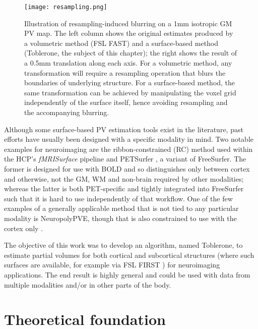 \begin{figure}
\centering
\texttt{[image: resampling.png]}
\caption{Illustration of resampling-induced blurring on a 1mm isotropic GM PV map. The left column shows the original estimates produced by a volumetric method (FSL FAST) and a surface-based method (Toblerone, the subject of this chapter); the right shows the result of a 0.5mm translation along each axis. For a volumetric method, any transformation will require a resampling operation that blurs the boundaries of underlying structure. For a surface-based method, the same transformation can be achieved by manipulating the voxel grid independently of the surface itself, hence avoiding resampling and the accompanying blurring.}
\label{resampling_demo}
\end{figure}

Although some surface-based PV estimation tools exist in the literature, past efforts have usually been designed with a specific modality in mind. Two notable examples for neuroimaging are the ribbon-constrained (RC) method used within the HCP's \textit{fMRISurface} pipeline \cite{Glasser2013} and PETSurfer \cite{Greve2016, Greve2014}, a variant of FreeSurfer. The former is designed for use with BOLD and so distinguishes only between cortex and otherwise, not the GM, WM and non-brain required by other modalities; whereas the latter is both PET-specific and tightly integrated into FreeSurfer such that it is hard to use independently of that workflow. One of the few examples of a generally applicable method that is not tied to any particular modality is NeuropolyPVE, though that is also constrained to use with the cortex only \cite{NeuropolyPVE}. 

The objective of this work was to develop an algorithm, named Toblerone, to estimate partial volumes for both cortical and subcortical structures (where such surfaces are available, for example via FSL FIRST \cite{Patenaude2011}) for neuroimaging applications. The end result is highly general and could be used with data from multiple modalities and/or in other parts of the body. 

\section{Theoretical foundation}

